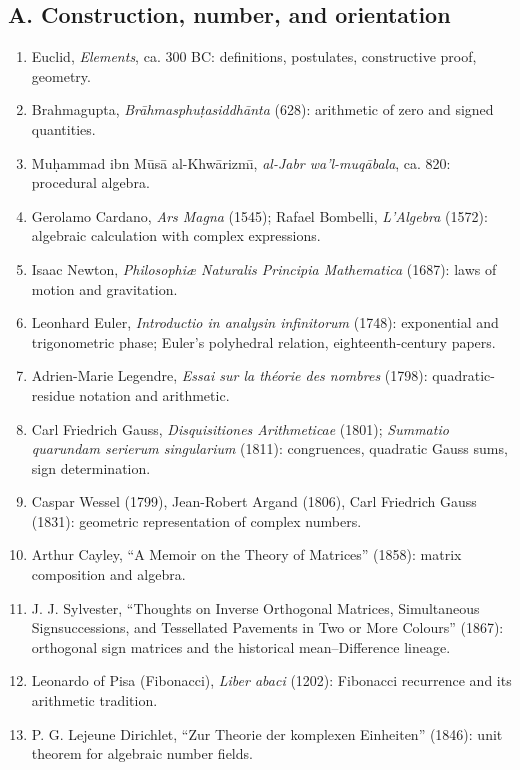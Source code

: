 \documentclass[10pt]{article}
\begin{document}
\subsection*{A. Construction, number, and orientation}
\begin{enumerate}[itemsep=1pt,topsep=3pt]
\item Euclid, \emph{Elements}, ca. 300 BC: definitions, postulates, constructive proof, geometry.
\item Brahmagupta, \emph{Br\={a}hmasphu\d{t}asiddh\={a}nta} (628): arithmetic of zero and signed quantities.
\item Mu\d{h}ammad ibn M\={u}s\={a} al-Khw\={a}rizm\={\i}, \emph{al-Jabr wa'l-muq\={a}bala}, ca. 820: procedural algebra.
\item Gerolamo Cardano, \emph{Ars Magna} (1545); Rafael Bombelli, \emph{L'Algebra} (1572): algebraic calculation with complex expressions.
\item Isaac Newton, \emph{Philosophi\ae{} Naturalis Principia Mathematica} (1687): laws of motion and gravitation.
\item Leonhard Euler, \emph{Introductio in analysin infinitorum} (1748): exponential and trigonometric phase; Euler's polyhedral relation, eighteenth-century papers.
\item Adrien-Marie Legendre, \emph{Essai sur la th\'eorie des nombres} (1798): quadratic-residue notation and arithmetic.
\item Carl Friedrich Gauss, \emph{Disquisitiones Arithmeticae} (1801); \emph{Summatio quarundam serierum singularium} (1811): congruences, quadratic Gauss sums, sign determination.
\item Caspar Wessel (1799), Jean-Robert Argand (1806), Carl Friedrich Gauss (1831): geometric representation of complex numbers.
\item Arthur Cayley, ``A Memoir on the Theory of Matrices'' (1858): matrix composition and algebra.
\item J. J. Sylvester, ``Thoughts on Inverse Orthogonal Matrices, Simultaneous Signsuccessions, and Tessellated Pavements in Two or More Colours'' (1867): orthogonal sign matrices and the historical mean--Difference lineage.
\item Leonardo of Pisa (Fibonacci), \emph{Liber abaci} (1202): Fibonacci recurrence and its arithmetic tradition.
\item P. G. Lejeune Dirichlet, ``Zur Theorie der komplexen Einheiten'' (1846): unit theorem for algebraic number fields.
\end{enumerate}
\end{document}
